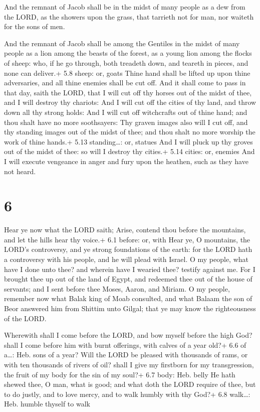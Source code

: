  And the remnant of Jacob shall be in the midst of many
people as a dew from the LORD, as the showers upon the grass, that
tarrieth not for man, nor waiteth for the sons of men.

 And the remnant of Jacob shall be among the Gentiles in
the midst of many people as a lion among the beasts of the forest, as a
young lion among the flocks of sheep: who, if he go through, both
treadeth down, and teareth in pieces, and none can deliver.+ 5.8 sheep:
or, goats  Thine hand shall be lifted up upon thine
adversaries, and all thine enemies shall be cut off.  And
it shall come to pass in that day, saith the LORD, that I will cut off
thy horses out of the midst of thee, and I will destroy thy chariots:
 And I will cut off the cities of thy land, and throw down
all thy strong holds:  And I will cut off witchcrafts out
of thine hand; and thou shalt have no more soothsayers: 
Thy graven images also will I cut off, and thy standing images out of
the midst of thee; and thou shalt no more worship the work of thine
hands.+ 5.13 standing\ldots: or, statues  And I will pluck
up thy groves out of the midst of thee: so will I destroy thy cities.+
5.14 cities: or, enemies  And I will execute vengeance in
anger and fury upon the heathen, such as they have not heard.

\hypertarget{section-5}{%
\section{6}\label{section-5}}

 Hear ye now what the LORD saith; Arise, contend thou before
the mountains, and let the hills hear thy voice.+ 6.1 before: or, with
 Hear ye, O mountains, the LORD's controversy, and ye strong
foundations of the earth: for the LORD hath a controversy with his
people, and he will plead with Israel.  O my people, what
have I done unto thee? and wherein have I wearied thee? testify against
me.  For I brought thee up out of the land of Egypt, and
redeemed thee out of the house of servants; and I sent before thee
Moses, Aaron, and Miriam.  O my people, remember now what
Balak king of Moab consulted, and what Balaam the son of Beor answered
him from Shittim unto Gilgal; that ye may know the righteousness of the
LORD.

 Wherewith shall I come before the LORD, and bow myself
before the high God? shall I come before him with burnt offerings, with
calves of a year old?+ 6.6 of a\ldots: Heb. sons of a year? 
Will the LORD be pleased with thousands of rams, or with ten thousands
of rivers of oil? shall I give my firstborn for my transgression, the
fruit of my body for the sin of my soul?+ 6.7 body: Heb. belly
 He hath shewed thee, O man, what is good; and what doth the
LORD require of thee, but to do justly, and to love mercy, and to walk
humbly with thy God?+ 6.8 walk\ldots: Heb. humble thyself to walk

